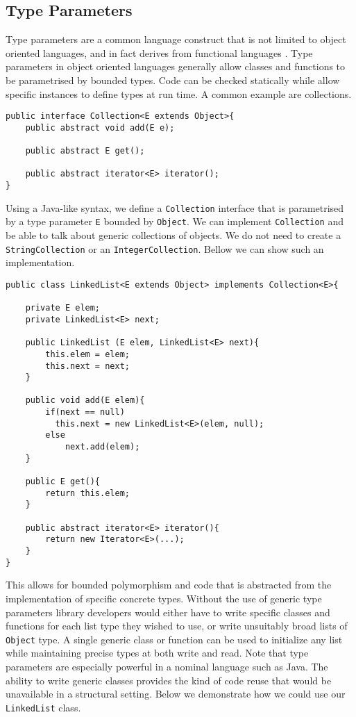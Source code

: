 \documentclass[11pt
              , a4paper
              , twoside
              , openright
              ]{report}
\numberwithin{case}{theorem}
\numberwithin{subcase}{case}
\begin{document}
\subsection{Type Parameters}
Type parameters are a common language construct that is not limited to object oriented languages, and in fact derives from functional languages \cite{Canning:1989:FPO:99370.99392}. Type parameters in object oriented languages generally allow classes and functions to be parametrised by bounded types. Code can be checked statically while allow specific instances to define types at run time. A common example are collections.
\begin{lstlisting}[mathescape, style=custom_lang]
public interface Collection<E extends Object>{
	public abstract void add(E e);
	
	public abstract E get();
	
	public abstract iterator<E> iterator();
}
\end{lstlisting}
Using a Java-like syntax, we define a \verb|Collection| interface that is parametrised by a type parameter \verb|E| bounded by \verb|Object|. We can implement \verb|Collection| and be able to talk about generic collections of objects. We do not need to create a \verb|StringCollection| or an \verb|IntegerCollection|. Bellow we can show such an implementation.
\begin{lstlisting}[mathescape, style=custom_lang]
public class LinkedList<E extends Object> implements Collection<E>{

	private E elem;
	private LinkedList<E> next;
	
	public LinkedList (E elem, LinkedList<E> next){
		this.elem = elem;
		this.next = next;
	}
	
	public void add(E elem){
		if(next == null)
		  this.next = new LinkedList<E>(elem, null);
		else
			next.add(elem);
	}
	
	public E get(){
		return this.elem;
	}
	
	public abstract iterator<E> iterator(){
		return new Iterator<E>(...);
	}
}
\end{lstlisting}
This allows for bounded polymorphism and code that is abstracted from the implementation of specific concrete types. Without the use of generic type parameters library developers would either have to write specific classes and functions for each list type they wished to use, or write unsuitably broad lists of \verb|Object| type. A single generic class or function can be used to initialize any list while maintaining precise types at both write and read. Note that type parameters are especially powerful in a nominal language such as Java. The ability to write generic classes provides the kind of code reuse that would be unavailable in a structural setting. Below we demonstrate how we could use our \verb|LinkedList| class.
\end{document}
